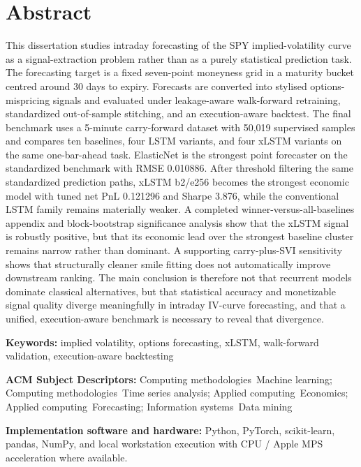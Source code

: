 \documentclass[12pt]{report}
\begin{document}
\chapter*{Abstract}
This dissertation studies intraday forecasting of the SPY implied-volatility curve as a signal-extraction problem rather than as a purely statistical prediction task. The forecasting target is a fixed seven-point moneyness grid in a maturity bucket centred around 30 days to expiry. Forecasts are converted into stylised options-mispricing signals and evaluated under leakage-aware walk-forward retraining, standardized out-of-sample stitching, and an execution-aware backtest. The final benchmark uses a 5-minute carry-forward dataset with 50,019 supervised samples and compares ten baselines, four LSTM variants, and four xLSTM variants on the same one-bar-ahead task. ElasticNet is the strongest point forecaster on the standardized benchmark with RMSE 0.010886. After threshold filtering the same standardized prediction paths, xLSTM b2/e256 becomes the strongest economic model with tuned net PnL 0.121296 and Sharpe 3.876, while the conventional LSTM family remains materially weaker. A completed winner-versus-all-baselines appendix and block-bootstrap significance analysis show that the xLSTM signal is robustly positive, but that its economic lead over the strongest baseline cluster remains narrow rather than dominant. A supporting carry-plus-SVI sensitivity shows that structurally cleaner smile fitting does not automatically improve downstream ranking. The main conclusion is therefore not that recurrent models dominate classical alternatives, but that statistical accuracy and monetizable signal quality diverge meaningfully in intraday IV-curve forecasting, and that a unified, execution-aware benchmark is necessary to reveal that divergence.

\vspace{0.8em}
\textbf{Keywords:} implied volatility, options forecasting, xLSTM, walk-forward validation, execution-aware backtesting

\textbf{ACM Subject Descriptors:} Computing methodologies~Machine learning; Computing methodologies~Time series analysis; Applied computing~Economics; Applied computing~Forecasting; Information systems~Data mining

\textbf{Implementation software and hardware:} Python, PyTorch, scikit-learn, pandas, NumPy, and local workstation execution with CPU / Apple MPS acceleration where available.
\end{document}
